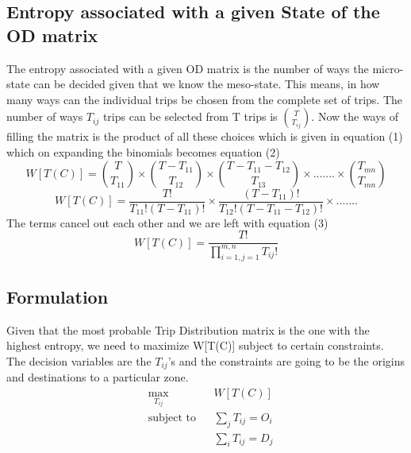 \documentclass[12pt]{article}
\begin{document}
\subsection{Entropy associated with a given State of the OD matrix}
The entropy associated with a given OD matrix is the number of ways the micro-state can be decided given that we know the meso-state. This means, in how many ways can the individual trips be chosen from the complete set of trips.
The number of ways $T_{ij}$ trips can be selected from T trips is $T \choose T_{ij}$.
\newline Now the ways of filling the matrix is the product of all these choices which is given in equation (1) which on expanding the binomials becomes equation (2)\\

    \begin{equation}
        W[T(C)] = {T\choose T_{11}} \times {T-T_{11}\choose T_{12}} \times {T-T_{11}-T_{12}\choose T_{13}} \times {.......} \times {T_{mn} \choose T_{mn}}
    \end{equation}
    \begin{equation}
        W[T(C)] = {\frac{T!}{T_{11}!(T - T_{11})!}} \times {\frac{(T - T_{11})!}{T_{12}!(T - T_{11} - T_{12})!}} \times .......
    \end{equation}
The terms cancel out each other and we are left with equation (3)
    \begin{equation}
        W[T(C)] = \frac{T!}{\prod_{i=1,j=1}^{m,n}T_{ij}!}
    \end{equation}

\subsection{Formulation}
Given that the most probable Trip Distribution matrix is the one with the highest entropy, we need to maximize W[T(C)] subject to certain constraints. The decision variables are the $T_{ij}$'s and the constraints are going to be the origins and destinations to a particular zone.
    \begin{equation*}
    \begin{aligned}
    & \underset{T_{ij}}{\text{max}}
    & & \mathrm{}W[T(C)] \\
    & \text{subject to}
    & &  \sum_{j}T_{ij} = O_{i}\\
    &&& \sum_{i}T_{ij} = D_{j}
    \end{aligned}
    \end{equation*}
    
\end{document}
